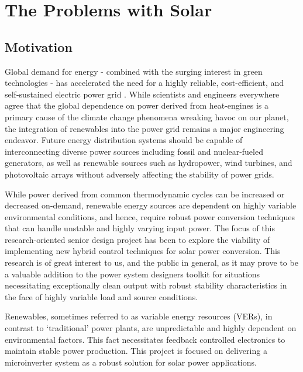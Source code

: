 
\chapter{The Problems with Solar} %

\label{Chapter1} %



\section{Motivation}
Global demand for energy - combined with the surging interest in green technologies - has accelerated the need for a highly reliable, cost-efficient, and self-sustained electric power grid \cite{futureGrid}. While scientists and engineers everywhere agree that the global dependence on power derived from heat-engines is a primary cause of the climate change phenomena wreaking havoc on our planet, the integration of renewables into the power grid remains a major engineering endeavor. Future energy distribution systems should be capable of interconnecting diverse power sources including fossil and nuclear-fueled generators, as well as renewable sources such as hydropower, wind turbines, and photovoltaic arrays without adversely affecting the stability of power grids. 

While power derived from common thermodynamic cycles can be increased or decreased on-demand, renewable energy sources are dependent on highly variable environmental conditions, and hence, require robust power conversion techniques that can handle unstable and highly varying input power\cite{ricardo}. The focus of this research-oriented senior design project has been to explore the viability of implementing new hybrid control techniques for solar power conversion. This research is of great interest to us, and the public in general, as it may prove to be a valuable addition to the power system designers toolkit for situations necessitating exceptionally clean output with robust stability characteristics in the face of highly variable load and source conditions.

Renewables, sometimes referred to as variable energy resources (VERs), in contrast to `traditional' power plants, are unpredictable and highly dependent on environmental factors. This fact necessitates feedback controlled electronics to maintain stable power production. This project is focused on delivering a microinverter system as a robust solution for solar power applications.


